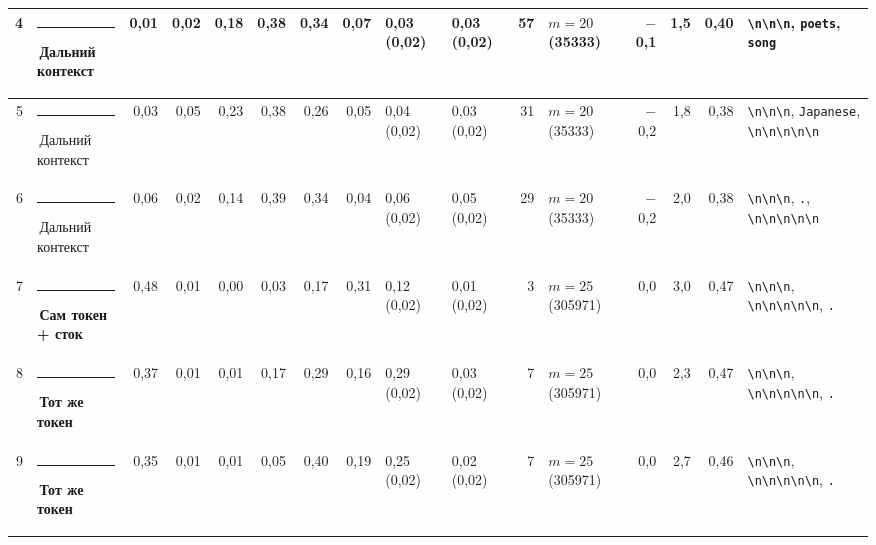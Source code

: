 \documentclass[10pt]{article}
\begin{document}
\begin{minipage}{\linewidth}
\begin{center}
{\begin{tabular}{|r|l|r|r|r|r|r|r|l|l|r|l|r|r|r|l|}
4 & \textcolor[HTML]{C3C2B7}{\rule{0.62em}{0.62em}}\,Дальний контекст & 0,01 & 0,02 & 0,18 & 0,38 & 0,34 & 0,07 & 0,03 (0,02) & 0,03 (0,02) & 57 & $m{=}20$ (35333) & $-$0,1 & 1,5 & 0,40 & \texttt{\textvisiblespace{}\textbackslash{}n\textbackslash{}n\textbackslash{}n}, \texttt{\textvisiblespace{}poets}, \texttt{\textvisiblespace{}song} \\ \hline
5 & \textcolor[HTML]{C3C2B7}{\rule{0.62em}{0.62em}}\,Дальний контекст & 0,03 & 0,05 & 0,23 & 0,38 & 0,26 & 0,05 & 0,04 (0,02) & 0,03 (0,02) & 31 & $m{=}20$ (35333) & $-$0,2 & 1,8 & 0,38 & \texttt{\textvisiblespace{}\textbackslash{}n\textbackslash{}n\textbackslash{}n}, \texttt{\textvisiblespace{}Japanese}, \texttt{\textbackslash{}n\textbackslash{}n\textbackslash{}n\textbackslash{}n\textbackslash{}n} \\ \hline
6 & \textcolor[HTML]{C3C2B7}{\rule{0.62em}{0.62em}}\,Дальний контекст & 0,06 & 0,02 & 0,14 & 0,39 & 0,34 & 0,04 & 0,06 (0,02) & 0,05 (0,02) & 29 & $m{=}20$ (35333) & $-$0,2 & 2,0 & 0,38 & \texttt{\textvisiblespace{}\textbackslash{}n\textbackslash{}n\textbackslash{}n}, \texttt{\textvisiblespace{}.}, \texttt{\textbackslash{}n\textbackslash{}n\textbackslash{}n\textbackslash{}n\textbackslash{}n} \\ \hline
7 & \textcolor[HTML]{2A78D6}{\rule{0.62em}{0.62em}}\,\textbf{Сам токен + сток} & 0,48 & 0,01 & 0,00 & 0,03 & 0,17 & 0,31 & 0,12 (0,02) & 0,01 (0,02) & 3 & $m{=}25$ (305971) & 0,0 & 3,0 & 0,47 & \texttt{\textvisiblespace{}\textbackslash{}n\textbackslash{}n\textbackslash{}n}, \texttt{\textbackslash{}n\textbackslash{}n\textbackslash{}n\textbackslash{}n\textbackslash{}n}, \texttt{\textvisiblespace{}.} \\ \hline
8 & \textcolor[HTML]{E87BA4}{\rule{0.62em}{0.62em}}\,\textbf{Тот же токен} & 0,37 & 0,01 & 0,01 & 0,17 & 0,29 & 0,16 & 0,29 (0,02) & 0,03 (0,02) & 7 & $m{=}25$ (305971) & 0,0 & 2,3 & 0,47 & \texttt{\textvisiblespace{}\textbackslash{}n\textbackslash{}n\textbackslash{}n}, \texttt{\textbackslash{}n\textbackslash{}n\textbackslash{}n\textbackslash{}n\textbackslash{}n}, \texttt{\textvisiblespace{}.} \\ \hline
9 & \textcolor[HTML]{E87BA4}{\rule{0.62em}{0.62em}}\,\textbf{Тот же токен} & 0,35 & 0,01 & 0,01 & 0,05 & 0,40 & 0,19 & 0,25 (0,02) & 0,02 (0,02) & 7 & $m{=}25$ (305971) & 0,0 & 2,7 & 0,46 & \texttt{\textvisiblespace{}\textbackslash{}n\textbackslash{}n\textbackslash{}n}, \texttt{\textbackslash{}n\textbackslash{}n\textbackslash{}n\textbackslash{}n\textbackslash{}n}, \texttt{\textvisiblespace{}.} \\ \hline

\end{tabular}}
\end{center}
\end{minipage}
\end{document}
